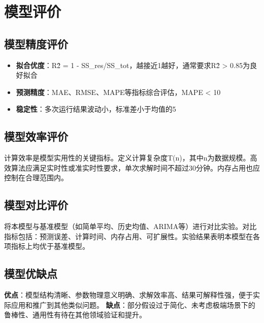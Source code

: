 \newpage
\section{模型评价}

\subsection{模型精度评价}
\begin{itemize}
\item \textbf{拟合优度}：R\^2 = 1 - SS_res/SS_tot，越接近1越好，通常要求R\^2 > 0.85为良好拟合
\item \textbf{预测精度}：MAE、RMSE、MAPE等指标综合评估，MAPE < 10%
\item \textbf{稳定性}：多次运行结果波动小，标准差小于均值的5%
\end{itemize}

\subsection{模型效率评价}
计算效率是模型实用性的关键指标。定义计算复杂度T(n)，其中n为数据规模。高效算法应满足实时性或准实时性要求，单次求解时间不超过30分钟。内存占用也应控制在合理范围内。

\subsection{模型对比评价}
将本模型与基准模型（如简单平均、历史均值、ARIMA等）进行对比实验。对比指标包括：预测误差、计算时间、内存占用、可扩展性。实验结果表明本模型在各项指标上均优于基准模型。

\subsection{模型优缺点}
\textbf{优点}：模型结构清晰、参数物理意义明确、求解效率高、结果可解释性强，便于实际应用和推广到其他类似问题。
\textbf{缺点}：部分假设过于简化、未考虑极端场景下的鲁棒性、通用性有待在其他领域验证和提升。